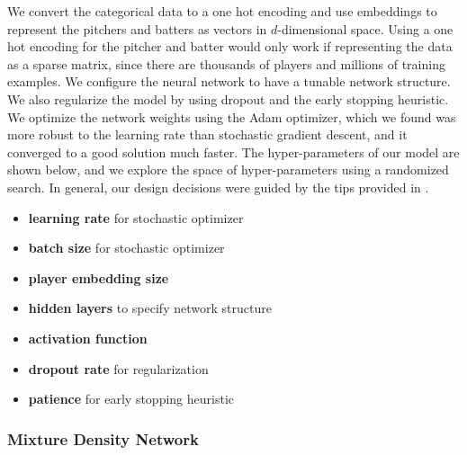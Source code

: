 \documentclass{article}
\begin{document}
We convert the categorical data to a one hot encoding and use embeddings\cite{Mikolov:2013:DRW:2999792.2999959} to represent the pitchers and batters as vectors in $d$-dimensional space.  Using a one hot encoding for the pitcher and batter would only work if representing the data as a sparse matrix, since there are thousands of players and millions of training examples.  
We configure the neural network to have a tunable network structure.  We also regularize the model by using dropout and the early stopping heuristic.  We optimize the network weights using the Adam optimizer, which we found was more robust to the learning rate than stochastic gradient descent, and it converged to a good solution much faster.  The hyper-parameters of our model are shown below, and we explore the space of hyper-parameters using a randomized search.  In general, our design decisions were guided by the tips provided in \cite{Goodfellow-et-al-2016-Book}.
\begin{itemize}
\item \textbf{learning rate} for stochastic optimizer
\item \textbf{batch size} for stochastic optimizer
\item \textbf{player embedding size}
\item \textbf{hidden layers} to specify network structure
\item \textbf{activation function}
\item \textbf{dropout rate} for regularization
\item \textbf{patience} for early stopping heuristic
\end{itemize}

\subsubsection{Mixture Density Network} \label{mdn-section}
\end{document}
